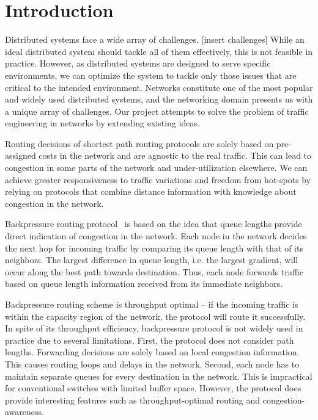 \label{sec:prob}


\section{Introduction}

Distributed systems face a wide array of challenges. [insert challenges] While an ideal distributed system should tackle all of them effectively, this is not feasible in practice. However, as distributed systems are designed to serve specific environments, we can optimize the system to tackle only those issues that are critical to the intended environment. Networks constitute one of the most popular and widely used distributed systems, and the networking domain presents us with a unique array of challenges. Our project attempts to solve the problem of traffic engineering in networks by extending existing ideas.

Routing decisions of shortest path routing protocols are solely based on pre-assigned costs in the network and are agnostic to the real traffic. This can lead to congestion in some parts of the network and under-utilization elsewhere. We can achieve greater responsiveness to traffic variations and freedom from hot-spots by relying on protocols that combine distance information with knowledge about congestion in the network. 

Backpressure routing protocol~\cite{BP-orig} is based on the idea that queue lengths provide direct indication of congestion in the network. Each node in the network decides the next hop for incoming traffic by comparing its queue length with that of its neighbors. The largest difference in queue length, i.e. the largest gradient, will occur along the best path towards destination. Thus, each node forwards traffic based on queue length information received from its immediate neighbors. 

Backpressure routing scheme is throughput optimal -- if the incoming traffic is within the capacity region of the network, the protocol will route it successfully. In spite of its throughput efficiency, backpressure protocol is not widely used in practice due to several limitations. First, the protocol does not consider path lengths. Forwarding decisions are solely based on local congestion information. This causes routing loops and delays in the network. Second, each node has to maintain separate queues for every destination in the network. This is impractical for conventional switches with limited buffer space. However, the protocol does provide interesting features such as throughput-optimal routing and congestion-awareness. 

